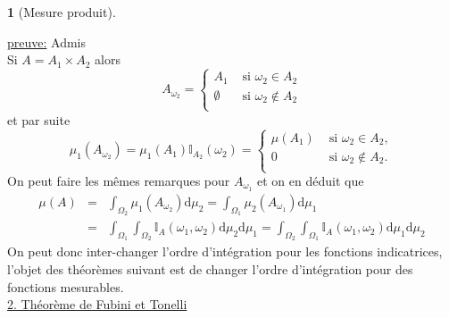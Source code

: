 \documentclass[8pt,notheorems]{beamer}
\def \Om{\Omega}
\def \om{\omega}
\newtheorem{theorem}{\translate{Theorem}}[section]
\newtheorem{theorem}{\translate{Theoreme}}
\theoremstyle{definition}
\theoremstyle{example}
\theoremstyle{mystyle}
\theoremstyle{plain}
\begin{document}
\begin{frame}[allowframebreaks]
\begin{theorem}[Mesure produit]
\end{theorem}
\underline{preuve:} Admis\\

Si $A=A_1\times A_2$ alors
$$
A_{\om_2}=
\begin{cases}
A_1&\text{ si }\om_2\in A_2\\
\emptyset&\text{ si }\om_2\notin A_2\\
\end{cases}
$$
et par suite
$$
\mu_1(A_{\om_2})=\mu_1(A_1)\mathbb{I}_{A_2}(\om_2)=
\begin{cases}
\mu(A_1)&\text{ si }\om_2\in A_2,\\
0&\text{ si }\om_2\notin A_2.\\
\end{cases}
$$
On peut faire les mêmes remarques pour $A_{\om_1}$ et on en déduit que
\begin{eqnarray*}
\mu(A)&=&\int_{\Om_2}\mu_1(A_{\om_2})\text{d}\mu_2=\int_{\Om_1}\mu_2(A_{\om_1})\text{d}\mu_1\\
&=&\int_{\Om_1}\int_{\Om_2}\mathbb{I}_{A}(\om_1,\om_2)\text{d}\mu_2\text{d}\mu_1=\int_{\Om_2}\int_{\Om_1}\mathbb{I}_{A}(\om_1,\om_2)\text{d}\mu_1\text{d}\mu_2
\end{eqnarray*}
On peut donc inter-changer l'ordre d'intégration pour les fonctions indicatrices, l'objet des théorèmes suivant est de changer l'ordre d'intégration pour des fonctions mesurables.\\
\underline{2. Théorème de Fubini et Tonelli}
\end{frame}
\end{document}
